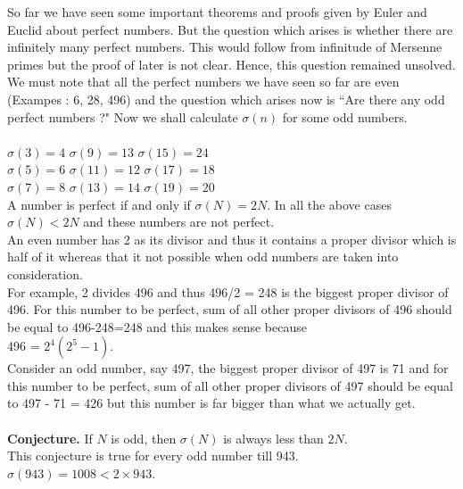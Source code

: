 \documentclass[a4paper,reqno,11pt]{book}
\theoremstyle{plain}%
\theoremstyle{definition}
\begin{document}
So far we have seen some important theorems and proofs given by Euler and Euclid about perfect numbers. But the question which arises is whether there are infinitely many perfect numbers. This would follow from infinitude of Mersenne primes but the proof of later is not clear. Hence, this question remained unsolved.\\
We must note that all the perfect numbers we have seen so far are even (Exampes : 6, 28, 496) and the question which arises now is ``Are there any odd perfect numbers ?" Now we shall calculate $\sigma(n)$ for some odd numbers.\\
\\
$\sigma(3) = 4$ \hspace{1cm} $\sigma(9) = 13$ \hspace{1.1cm}   $\sigma(15) = 24$\\
$\sigma(5) = 6$ \hspace{1cm} $\sigma(11) = 12$ \hspace{1cm} $\sigma(17) = 18$\\
$\sigma(7) = 8$ \hspace{1cm} $\sigma(13) = 14$ \hspace{1cm}  $\sigma(19) = 20$\\
A number is perfect if and only if $\sigma(N) = 2N.$
In all the above cases $\sigma(N) < 2N $ and these numbers are not perfect.\\
An even number has 2 as its divisor and thus it contains a proper divisor which is half of it whereas that it not possible when odd numbers are taken into consideration.\\
For example, 2 divides 496 and thus 496/2 = 248 is the biggest proper divisor of 496. For this number to be perfect, sum of all other proper divisors of 496 should be equal to 496-248=248 and this makes sense because\\ 496 = $2^4(2^5-1).$\\
Consider an odd number, say 497, the biggest proper divisor of 497 is 71 and for this number to be perfect, sum of all other proper divisors of 497 should be equal to 497 - 71 = 426 but this number is far bigger than what we actually get.\\
\\
\textbf{Conjecture.} If $N$ is odd, then $\sigma(N)$ is always less than $2N$. \\
This conjecture is true for every odd number till 943.\\ $\sigma(943) = 1008 < 2 \times 943$. \\
\end{document}

